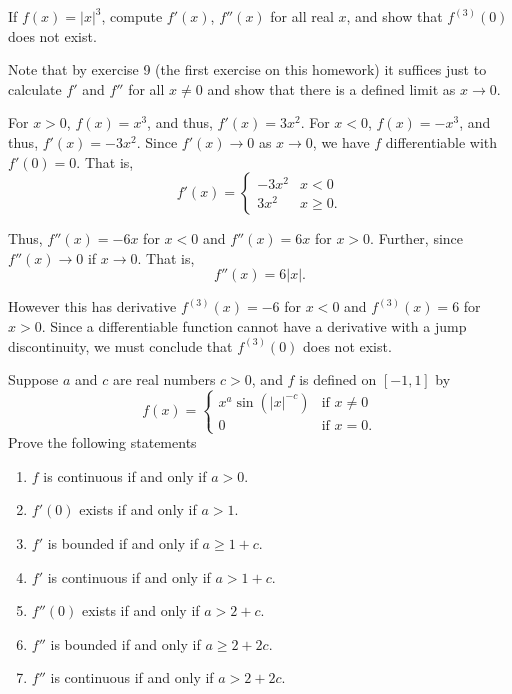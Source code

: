 \documentclass[12 pt, letterpaper]{hmcpset}
\begin{document}
\pagebreak

\begin{problem}
	If $f(x) = \lvert x \rvert^{3}$, compute $f'(x)$, $f''(x)$ for all real $x$, and show that $f^{(3)}(0)$ does not exist.	
\end{problem}

\begin{solution}
	Note that by exercise 9 (the first exercise on this homework) it suffices just to calculate $f'$ and $f''$ for all $x \neq 0$ and show that there is a defined limit as $x \to 0$.

	For $x > 0$, $f(x) = x^{3}$, and thus, $f'(x) = 3 x^{2}$. For $x < 0$, $f(x) = - x^{3}$, and thus, $f'(x) = -3 x^{2}$. Since $f'(x) \to 0$ as $x \to 0$, we have $f$ differentiable with $f'(0) = 0$. That is,
	\[
		f'(x) = \begin{cases}
			- 3 x^{2} & x < 0 \\
			3 x^{2} & x \ge 0.
		\end{cases}
	\]

	Thus,  $f''(x) = - 6 x$ for $x < 0$ and $f''(x) = 6 x$ for $x > 0$. Further, since $f''(x) \to 0$ if $x \to 0$. That is,
	\[
		f''(x) = 6 \lvert x \rvert.
	\]

	However this has derivative $f^{(3)}(x) = -6$ for $x < 0$ and $f^{(3)}(x) = 6$ for $x > 0$. Since a differentiable function cannot have a derivative with a jump discontinuity, we must conclude that $f^{(3)}(0)$ does not exist.
\end{solution}

\pagebreak

\begin{problem}
	Suppose $a$ and $c$ are real numbers $c > 0$, and $f$ is defined on $[-1, 1]$ by
	\[
		f(x) = \begin{cases}
			x^{a} \sin (\lvert x \rvert^{-c}) & \text{if } x \neq 0 \\
			0 & \text{if } x = 0.
		\end{cases}
	\]
	Prove the following statements
	\begin{enumerate}
		\item $f$ is continuous if and only if $a > 0$.
		\item $f'(0)$ exists if and only if $a > 1$.
		\item $f'$ is bounded if and only if $a \ge 1 + c$.
		\item $f'$ is continuous if and only if $a > 1 + c$.
		\item $f''(0)$ exists if and only if $a > 2 + c$.
		\item $f''$ is bounded if and only if $a \ge 2 + 2c$.
		\item $f''$ is continuous if and only if $a > 2 + 2c$.
	\end{enumerate}
\end{problem}
\end{document}
